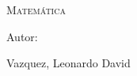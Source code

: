 




\centering
\hspace{10pt}

\begin{figure}[h]
\centering
{}
\label{1.0}
\end{figure}


{\scshape\Huge  \par}
{\scshape\Huge Matemática \par}
\vspace{1cm}

{\Large Autor: \par}
{\Large Vazquez, Leonardo David \par}
\vspace{1cm}

